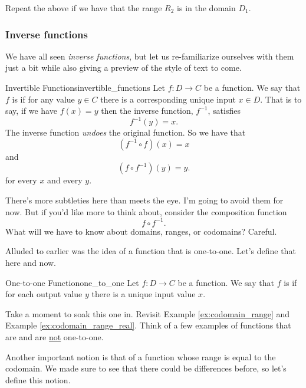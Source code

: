     \begin{exercise}
    Repeat the above if we have that the range $R_2$ is in the domain $D_1$.
    \end{exercise}

    \subsubsection{Inverse functions}

    We have all seen \emph{inverse functions}, but let us re-familiarize ourselves with them just a bit while also giving a preview of the style of text to come.

    \begin{df}{Invertible Functions}{invertible_functions}
    Let $f\colon D \to C$ be a function. We say that $f$ is  if for any value $y\in C$ there is a corresponding unique input $x\in D$.  That is to say, if we have $f(x)=y$ then the inverse function, $f^{-1}$, satisfies
    \[
    f^{-1}(y)=x.
    \]
    The inverse function \emph{undoes} the original function. So we have that
    \[
    (f^{-1}\circ f)(x)=x
    \]
    and
    \[
    (f\circ f^{-1})(y)=y.
    \]
    for every $x$ and every $y$.
    \end{df}

    \begin{remark}
    There's more subtleties here than meets the eye.  I'm going to avoid them for now.  But if you'd like more to think about, consider the composition function
    \[
    f\circ f^{-1}.
    \]
    What will we have to know about domains, ranges, or codomains? Careful.
    \end{remark}

    Alluded to earlier was the idea of a function that is one-to-one. Let's define that here and now.
    \begin{df}{One-to-one Function}{one_to_one}
    Let $f\colon D \to C$ be a function. We say that $f$ is  if for each output value $y$ there is a unique input value $x$.
    \end{df}
    \noindent Take a moment to soak this one in. Revisit Example \ref{ex:codomain_range} and Example \ref{ex:codomain_range_real}. Think of a few examples of functions that are and are \underline{not} one-to-one.

    Another important notion is that of a function whose range is equal to the codomain.  We made sure to see that there could be differences before, so let's define this notion.

